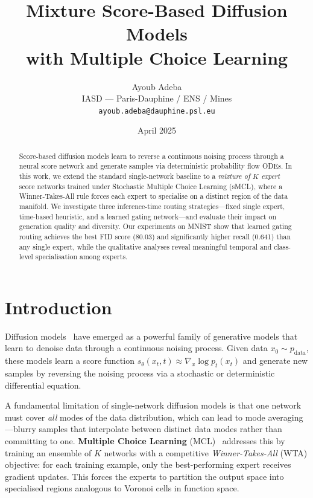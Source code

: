 \documentclass[11pt,a4paper]{article}
\title{%
  Mixture Score-Based Diffusion Models\\
  with Multiple Choice Learning}
\author{
  Ayoub Adeba\\
  IASD — Paris-Dauphine / ENS / Mines\\
  \texttt{ayoub.adeba@dauphine.psl.eu}
}
\date{April 2025}
\begin{document}
\maketitle

\begin{abstract}
Score-based diffusion models learn to reverse a continuous noising process
through a neural score network and generate samples via deterministic
probability flow ODEs. In this work, we extend the standard single-network
baseline to a \emph{mixture of $K$ expert} score networks trained under
Stochastic Multiple Choice Learning (sMCL), where a Winner-Takes-All rule
forces each expert to specialise on a distinct region of the data manifold.
We investigate three inference-time routing strategies---fixed single expert,
time-based heuristic, and a learned gating network---and evaluate their
impact on generation quality and diversity. Our experiments on MNIST show
that learned gating routing achieves the best FID score (80.03) and
significantly higher recall (0.641) than any single expert, while the
qualitative analyses reveal meaningful temporal and class-level
specialisation among experts.
\end{abstract}

\section{Introduction}

Diffusion models~\cite{song2021scorebased,ho2020denoising} have emerged as
a powerful family of generative models that learn to denoise data through a
continuous noising process. Given data $x_0 \sim p_{\text{data}}$, these
models learn a score function $s_\theta(x_t, t) \approx \nabla_x \log
p_t(x_t)$ and generate new samples by reversing the noising process via a
stochastic or deterministic differential equation.

A fundamental limitation of single-network diffusion models is that one
network must cover \emph{all} modes of the data distribution, which can
lead to mode averaging---blurry samples that interpolate between distinct
data modes rather than committing to one. \textbf{Multiple Choice Learning}
(MCL)~\cite{guzmanrivera2012multiple,lee2016stochastic} addresses this by
training an ensemble of $K$ networks with a competitive
\emph{Winner-Takes-All} (WTA) objective: for each training example, only
the best-performing expert receives gradient updates. This forces the
experts to partition the output space into specialised regions analogous to
Voronoi cells in function space.
\end{document}
